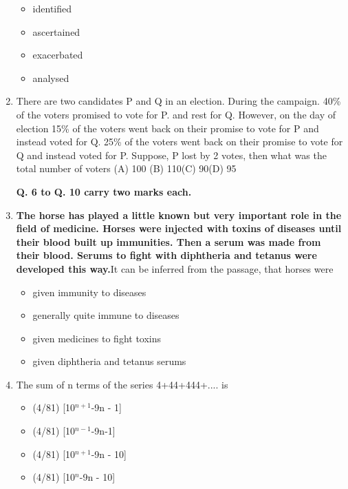 \documentclass[journal]{IEEEtran}
\begin{document}
\begin{enumerate}
\begin{itemize}
			\item[(A)] identified
			\item[(B)] ascertained
			\item[(C)] exacerbated
			\item[(D)] analysed
		\end{itemize}
	\item {There are two candidates P and Q in an election. During the campaign. 40\% of the voters promised to vote for P. and rest for Q. However, on the day of election 15\% of the voters went back on their promise to vote for P and instead voted for Q. 25\% of the voters went back on their promise to vote for Q and instead voted for P. Suppose, P lost by 2 votes, then what was the total number of voters
		\newline(A) 100 \hspace{10mm} (B) 110\hspace{10mm}(C) 90\hspace{10mm}(D) 95}

	\textbf{Q. 6 to Q. 10 carry two marks each.}
\item{ \textbf{The horse has played a little known but very important role in the field of medicine. Horses were injected with toxins of diseases until their blood built up immunities. Then a serum was made from their blood. Serums to fight with diphtheria and tetanus were developed this way.}\newline It can be inferred from the passage, that horses were}

		\begin{itemize}
			\item[(A)] given immunity to diseases
			\item[(B)] generally quite immune to diseases
			\item[(C)] given medicines to fight toxins
			\item[(D)] given diphtheria and tetanus serums

		\end{itemize}

	\item {The sum of n terms of the series 4+44+444+.... is}
		\begin{itemize}
			\item[(A)] (4/81) [10$^{n+1}$-9n - 1]
			\item[(B)] (4/81) [10$^{n-1}$-9n-1]
			\item[(C)] (4/81) [10$^{n+1}$-9n - 10]
			\item[(D)] (4/81) [10$^n$-9n - 10]


\end{itemize}
\end{enumerate}
\end{document}
